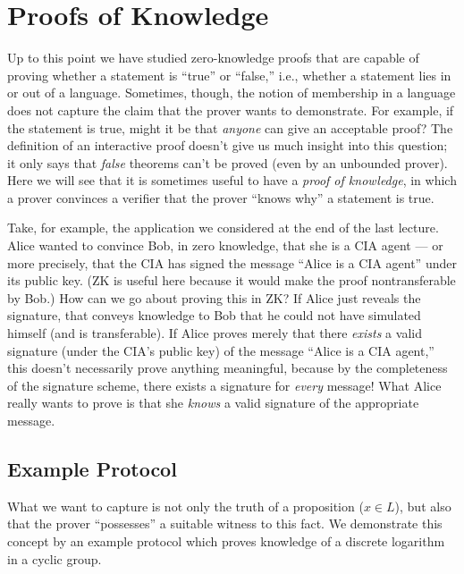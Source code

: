\documentclass[11pt]{article}
\begin{document}
\thispagestyle{fancy}          %


\section{Proofs of Knowledge}
\label{sec:pok}

Up to this point we have studied zero-knowledge proofs that are
capable of proving whether a statement is ``true'' or ``false,'' i.e.,
whether a statement lies in or out of a language.  Sometimes, though,
the notion of membership in a language does not capture the claim that
the prover wants to demonstrate.  For example, if the statement is
true, might it be that \emph{anyone} can give an acceptable proof?
The definition of an interactive proof doesn't give us much insight
into this question; it only says that \emph{false} theorems can't be
proved (even by an unbounded prover).  Here we will see that it is
sometimes useful to have a \emph{proof of knowledge}, in which a
prover convinces a verifier that the prover ``knows why'' a statement
is true.

Take, for example, the application we considered at the end of the
last lecture.  Alice wanted to convince Bob, in zero knowledge, that
she is a CIA agent --- or more precisely, that the CIA has signed the
message ``Alice is a CIA agent'' under its public key.  (ZK is useful
here because it would make the proof nontransferable by Bob.)  How can
we go about proving this in ZK?  If Alice just reveals the signature,
that conveys knowledge to Bob that he could not have simulated himself
(and is transferable).  If Alice proves merely that there
\emph{exists} a valid signature (under the CIA's public key) of the
message ``Alice is a CIA agent,'' this doesn't necessarily prove
anything meaningful, because by the completeness of the signature
scheme, there exists a signature for \emph{every} message!  What Alice
really wants to prove is that she \emph{knows} a valid signature of
the appropriate message.

\subsection{Example Protocol}
\label{sec:example-protocol}

What we want to capture is not only the truth of a proposition ($x \in
L$), but also that the prover ``possesses'' a suitable witness to this
fact.  We demonstrate this concept by an example protocol which proves
knowledge of a discrete logarithm in a cyclic group.
\end{document}
